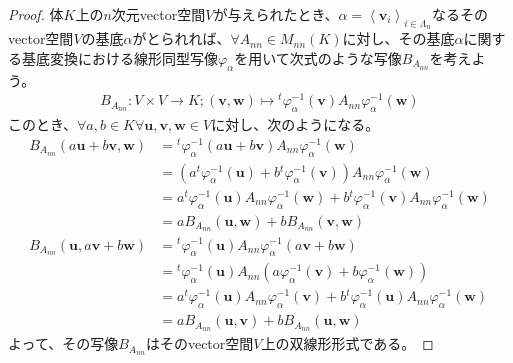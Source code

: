 \documentclass[dvipdfmx]{jsarticle}
\begin{document}
\begin{proof}
体$K$上の$n$次元vector空間$V$が与えられたとき、$\alpha = \left\langle \mathbf{v}_{i} \right\rangle_{i \in \varLambda_{n}}$なるそのvector空間$V$の基底$\alpha$がとられれば、$\forall A_{nn} \in M_{nn}(K)$に対し、その基底$\alpha$に関する基底変換における線形同型写像$\varphi_{\alpha}$を用いて次式のような写像$B_{A_{nn}}$を考えよう。
\begin{align*}
B_{A_{nn}}:V \times V \rightarrow K;\left( \mathbf{v},\mathbf{w} \right) \mapsto{}^{t}\varphi_{\alpha}^{- 1}\left( \mathbf{v} \right)A_{nn}\varphi_{\alpha}^{- 1}\left( \mathbf{w} \right)
\end{align*}
このとき、$\forall a,b \in K\forall\mathbf{u},\mathbf{v},\mathbf{w} \in V$に対し、次のようになる。
\begin{align*}
B_{A_{nn}}\left( a\mathbf{u} + b\mathbf{v},\mathbf{w} \right) &={}^{t}\varphi_{\alpha}^{- 1}\left( a\mathbf{u} + b\mathbf{v} \right)A_{nn}\varphi_{\alpha}^{- 1}\left( \mathbf{w} \right)\\
&= \left( a{}^{t}\varphi_{\alpha}^{- 1}\left( \mathbf{u} \right) + b{}^{t}\varphi_{\alpha}^{- 1}\left( \mathbf{v} \right) \right)A_{nn}\varphi_{\alpha}^{- 1}\left( \mathbf{w} \right)\\
&= a{}^{t}\varphi_{\alpha}^{- 1}\left( \mathbf{u} \right)A_{nn}\varphi_{\alpha}^{- 1}\left( \mathbf{w} \right) + b{}^{t}\varphi_{\alpha}^{- 1}\left( \mathbf{v} \right)A_{nn}\varphi_{\alpha}^{- 1}\left( \mathbf{w} \right)\\
&= aB_{A_{nn}}\left( \mathbf{u},\mathbf{w} \right) + bB_{A_{nn}}\left( \mathbf{v},\mathbf{w} \right)\\
B_{A_{nn}}\left( \mathbf{u},a\mathbf{v} + b\mathbf{w} \right) &={}^{t}\varphi_{\alpha}^{- 1}\left( \mathbf{u} \right)A_{nn}\varphi_{\alpha}^{- 1}\left( a\mathbf{v} + b\mathbf{w} \right)\\
&={}^{t}\varphi_{\alpha}^{- 1}\left( \mathbf{u} \right)A_{nn}\left( a\varphi_{\alpha}^{- 1}\left( \mathbf{v} \right) + b\varphi_{\alpha}^{- 1}\left( \mathbf{w} \right) \right)\\
&= a{}^{t}\varphi_{\alpha}^{- 1}\left( \mathbf{u} \right)A_{nn}\varphi_{\alpha}^{- 1}\left( \mathbf{v} \right) + b{}^{t}\varphi_{\alpha}^{- 1}\left( \mathbf{u} \right)A_{nn}\varphi_{\alpha}^{- 1}\left( \mathbf{w} \right)\\
&= aB_{A_{nn}}\left( \mathbf{u},\mathbf{v} \right) + bB_{A_{nn}}\left( \mathbf{u},\mathbf{w} \right)
\end{align*}
よって、その写像$B_{A_{nn}}$はそのvector空間$V$上の双線形形式である。\par

\end{proof}
\end{document}
